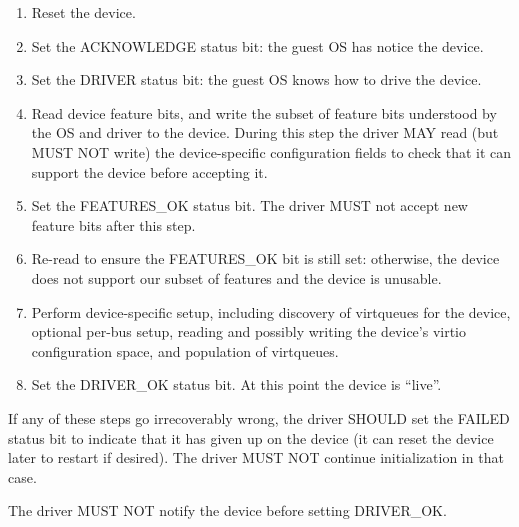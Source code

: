 \begin{enumerate}
\item Reset the device.

\item Set the ACKNOWLEDGE status bit: the guest OS has notice the device.

\item Set the DRIVER status bit: the guest OS knows how to drive the device.

\item\label{itm:General Initialization And Device Operation /
Device Initialization / Read feature bits} Read device feature bits, and write the subset of feature bits
   understood by the OS and driver to the device.  During this step the
   driver MAY read (but MUST NOT write) the device-specific configuration fields to check that it can support the device before accepting it.

\item\label{itm:General Initialization And Device Operation / Device Initialization / Set FEATURES-OK} Set the FEATURES_OK status bit.  The driver MUST not accept
   new feature bits after this step.

\item\label{itm:General Initialization And Device Operation / Device Initialization / Re-read FEATURES-OK} Re-read  to ensure the FEATURES_OK bit is still
   set: otherwise, the device does not support our subset of features
   and the device is unusable.

\item\label{itm:General Initialization And Device Operation / Device Initialization / Device-specific Setup} Perform device-specific setup, including discovery of virtqueues for the
   device, optional per-bus setup, reading and possibly writing the
   device's virtio configuration space, and population of virtqueues.

\item\label{itm:General Initialization And Device Operation / Device Initialization / Set DRIVER-OK} Set the DRIVER_OK status bit.  At this point the device is
   ``live''.
\end{enumerate}

If any of these steps go irrecoverably wrong, the driver SHOULD
set the FAILED status bit to indicate that it has given up on the
device (it can reset the device later to restart if desired).  The
driver MUST NOT continue initialization in that case.

The driver MUST NOT notify the device before setting DRIVER_OK.

